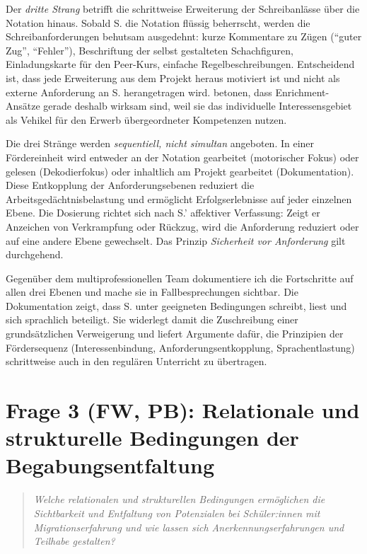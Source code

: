 \documentclass[ngerman, a4paper]{article}
\begin{document}
Der \textit{dritte Strang} betrifft die schrittweise Erweiterung der
Schreibanlässe über die Notation hinaus. Sobald S. die Notation flüssig beherrscht,
werden die Schreibanforderungen behutsam ausgedehnt: kurze Kommentare zu
Zügen (\enquote{guter Zug}, \enquote{Fehler}), Beschriftung der selbst gestalteten
Schachfiguren, Einladungskarte für den Peer-Kurs, einfache Regelbeschreibungen.
Entscheidend ist, dass jede Erweiterung aus dem Projekt heraus motiviert ist
und nicht als externe Anforderung an S. herangetragen wird. \textcite[S.\,254--273]{fischer2020begabungsfoerderung}
betonen, dass Enrichment-Ansätze gerade deshalb wirksam sind, weil sie das
individuelle Interessensgebiet als Vehikel für den Erwerb übergeordneter
Kompetenzen nutzen.

Die drei Stränge werden \textit{sequentiell, nicht simultan} angeboten. In einer
Fördereinheit wird entweder an der Notation gearbeitet (motorischer Fokus)
oder gelesen (Dekodierfokus) oder inhaltlich am Projekt gearbeitet
(Dokumentation). Diese Entkopplung der Anforderungsebenen reduziert die
Arbeitsgedächtnisbelastung und ermöglicht Erfolgserlebnisse auf jeder
einzelnen Ebene. Die Dosierung richtet sich nach S.' affektiver Verfassung:
Zeigt er Anzeichen von Verkrampfung oder Rückzug, wird die Anforderung
reduziert oder auf eine andere Ebene gewechselt. Das Prinzip
\textit{Sicherheit vor Anforderung} gilt durchgehend.

Gegenüber dem multiprofessionellen Team dokumentiere ich die Fortschritte
auf allen drei Ebenen und mache sie in Fallbesprechungen sichtbar. Die
Dokumentation zeigt, dass S. unter geeigneten Bedingungen schreibt, liest
und sich sprachlich beteiligt. Sie widerlegt damit die Zuschreibung einer
grundsätzlichen Verweigerung und liefert Argumente dafür, die Prinzipien
der Fördersequenz (Interessenbindung, Anforderungsentkopplung,
Sprachentlastung) schrittweise auch in den regulären Unterricht zu übertragen.

\newpage
\section{Frage 3 (FW, PB): Relationale und strukturelle Bedingungen
  der Begabungsentfaltung}
\label{sec:frage3}
 
\begin{quote}\itshape
Welche relationalen und strukturellen Bedingungen ermöglichen die
Sichtbarkeit und Entfaltung von Potenzialen bei Schüler:innen mit
Migrationserfahrung und wie lassen sich Anerkennungserfahrungen
und Teilhabe gestalten?
\end{quote}
\end{document}
